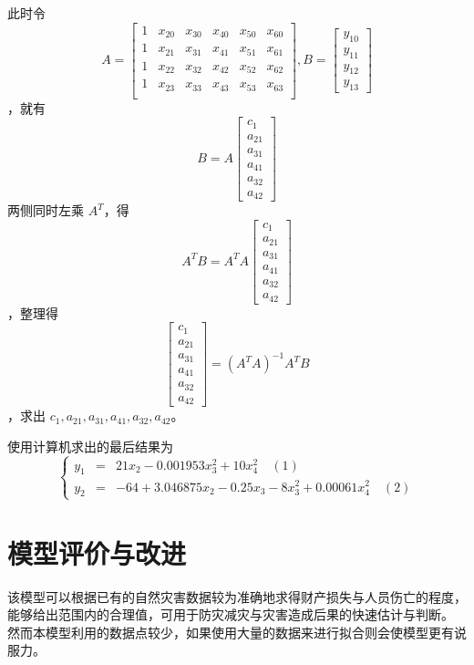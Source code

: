 \documentclass[UTF8]{ctexart}
\begin{document}
此时令
$$
A = 
\begin{bmatrix}
  1 & x_{20} & x_{30} & x_{40} & x_{50} & x_{60} \\
  1 & x_{21} & x_{31} & x_{41} & x_{51} & x_{61} \\
  1 & x_{22} & x_{32} & x_{42} & x_{52} & x_{62} \\
  1 & x_{23} & x_{33} & x_{43} & x_{53} & x_{63} \\
\end{bmatrix}
, B = 
\begin{bmatrix}
  y_{10} \\
  y_{11} \\
  y_{12} \\
  y_{13}
\end{bmatrix}
$$
，就有
$$
B = A
\begin{bmatrix}
  c_1 \\
  a_{21} \\
  a_{31} \\
  a_{41} \\
  a_{32} \\
  a_{42}
\end{bmatrix}
$$
两侧同时左乘 $A^T$，得
$$
A^{T}B = A^{T}A
\begin{bmatrix}
  c_1 \\
  a_{21} \\
  a_{31} \\
  a_{41} \\
  a_{32} \\
  a_{42}
\end{bmatrix}
$$
，整理得
$$
\begin{bmatrix}
  c_1 \\
  a_{21} \\
  a_{31} \\
  a_{41} \\
  a_{32} \\
  a_{42}
\end{bmatrix}
 = (A^{T}A)^{-1}A^{T}B
$$
，求出 $c_1, a_{21}, a_{31}, a_{41}, a_{32}, a_{42}$。

使用计算机求出的最后结果为
$$
\left\{
\begin{array}{rcl}
y_1 & = & 21x_2 - 0.001953x_3^2 + 10x_4^2 \quad(1) \\
y_2 & = & -64 + 3.046875x_2 - 0.25x_3 - 8x_3^2 + 0.00061x_4^2 \quad(2)
\end{array}
\right.
$$

\section{模型评价与改进}
该模型可以根据已有的自然灾害数据较为准确地求得财产损失与人员伤亡的程度，能够给出范围内的合理值，可用于防灾减灾与灾害造成后果的快速估计与判断。
然而本模型利用的数据点较少，如果使用大量的数据来进行拟合则会使模型更有说服力。
\end{document}

